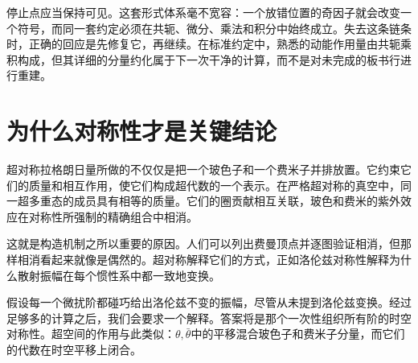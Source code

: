 停止点应当保持可见。这套形式体系毫不宽容：一个放错位置的奇因子就会改变一个符号，而同一套约定必须在共轭、微分、乘法和积分中始终成立。失去这条链条时，正确的回应是先修复它，再继续。在标准约定中，熟悉的动能作用量由共轭乘积构成，但其详细的分量约化属于下一次干净的计算，而不是对未完成的板书行进行重建。

\section{为什么对称性才是关键结论}

超对称拉格朗日量所做的不仅仅是把一个玻色子和一个费米子并排放置。它约束它们的质量和相互作用，使它们构成超代数的一个表示。在严格超对称的真空中，同一超多重态的成员具有相等的质量。它们的圈贡献相互关联，玻色和费米的紫外效应在对称性所强制的精确组合中相消。

这就是构造机制之所以重要的原因。人们可以列出费曼顶点并逐图验证相消，但那样相消看起来就像是偶然的。超对称解释它们的方式，正如洛伦兹对称性解释为什么散射振幅在每个惯性系中都一致地变换。


\begin{classroomqa}
\end{classroomqa}

\begin{classroomqa}
\end{classroomqa}

假设每一个微扰阶都碰巧给出洛伦兹不变的振幅，尽管从未提到洛伦兹变换。经过足够多的计算之后，我们会要求一个解释。答案将是那个一次性组织所有阶的时空对称性。超空间的作用与此类似：\(\theta,\bar\theta\)中的平移混合玻色子和费米子分量，而它们的代数在时空平移上闭合。

\begin{classroomqa}
\end{classroomqa}

